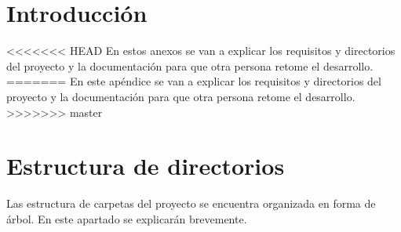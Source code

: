 
\section{Introducción}
<<<<<<< HEAD
En estos anexos se van a explicar los requisitos y directorios del proyecto y la documentación para que otra persona retome el desarrollo.
=======
En este apéndice se van a explicar los requisitos y directorios del proyecto y la documentación para que otra persona retome el desarrollo.
>>>>>>> master
\section{Estructura de directorios}
Las estructura de carpetas del proyecto se encuentra organizada en forma de árbol. En este apartado se explicarán brevemente.

